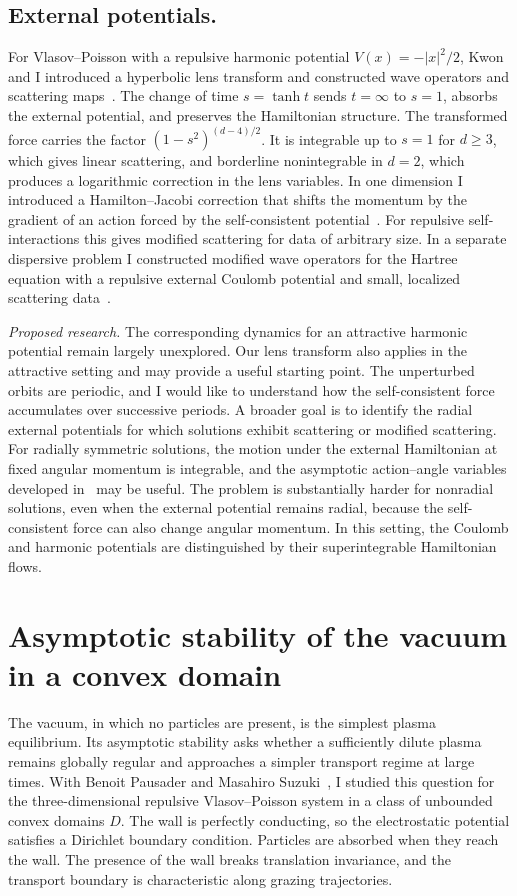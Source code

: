 \documentclass[reqno,10pt,a4paper]{amsart}
\numberwithin{equation}{section}
\begin{document}
\subsection*{External potentials.}
For Vlasov--Poisson with a repulsive harmonic potential $V(x)=-|x|^2/2$, Kwon and I introduced a hyperbolic lens transform and constructed wave operators and scattering maps~\cite{HK26}. The change of time $s=\tanh t$ sends $t=\infty$ to $s=1$, absorbs the external potential, and preserves the Hamiltonian structure. The transformed force carries the factor $(1-s^2)^{(d-4)/2}$. It is integrable up to $s=1$ for $d\geq3$, which gives linear scattering, and borderline nonintegrable in $d=2$, which produces a logarithmic correction in the lens variables. In one dimension I introduced a Hamilton--Jacobi correction that shifts the momentum by the gradient of an action forced by the self-consistent potential~\cite{H26}. For repulsive self-interactions this gives modified scattering for data of arbitrary size. In a separate dispersive problem I constructed modified wave operators for the Hartree equation with a repulsive external Coulomb potential and small, localized scattering data~\cite{H24}.

\emph{Proposed research.} The corresponding dynamics for an attractive harmonic potential remain largely unexplored. Our lens transform also applies in the attractive setting and may provide a useful starting point. The unperturbed orbits are periodic, and I would like to understand how the self-consistent force accumulates over successive periods. A broader goal is to identify the radial external potentials for which solutions exhibit scattering or modified scattering. For radially symmetric solutions, the motion under the external Hamiltonian at fixed angular momentum is integrable, and the asymptotic action--angle variables developed in~\cite{PW21,PWY22} may be useful. The problem is substantially harder for nonradial solutions, even when the external potential remains radial, because the self-consistent force can also change angular momentum. In this setting, the Coulomb and harmonic potentials are distinguished by their superintegrable Hamiltonian flows.

\section{Asymptotic stability of the vacuum in a convex domain}

The vacuum, in which no particles are present, is the simplest plasma equilibrium. Its asymptotic stability asks whether a sufficiently dilute plasma remains globally regular and approaches a simpler transport regime at large times. With Benoit Pausader and Masahiro Suzuki~\cite{HPS24}, I studied this question for the three-dimensional repulsive Vlasov--Poisson system in a class of unbounded convex domains $D$. The wall is perfectly conducting, so the electrostatic potential satisfies a Dirichlet boundary condition. Particles are absorbed when they reach the wall. The presence of the wall breaks translation invariance, and the transport boundary is characteristic along grazing trajectories.
\end{document}
